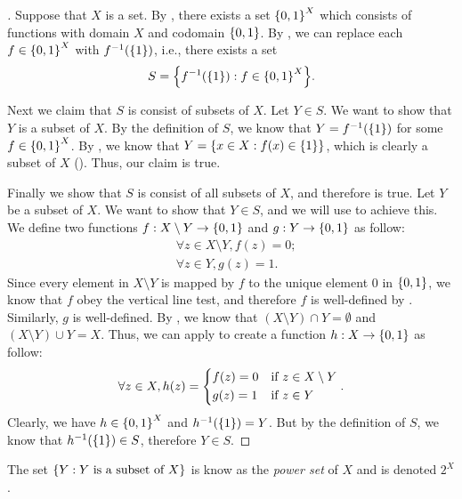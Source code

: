 \begin{proof}[]
  Suppose that \(X\) is a set.
  By , there exists a set \(\left\lbrace0, 1\right\rbrace^X\) which consists of functions with domain \(X\) and codomain \(\left\lbrace0, 1\right\rbrace\).
  By , we can replace each \(f \in \left\lbrace0, 1\right\rbrace^X\) with \(f^{-1}\pa{\set{1}}\), i.e., there exists a set
  \[
    S = \set{f^{-1}\pa{\set{1}} : f \in \set{0, 1}^X}.
  \]

  Next we claim that \(S\) is consist of subsets of \(X\).
  Let \(Y \in S\).
  We want to show that \(Y\) is a subset of \(X\).
  By the definition of \(S\), we know that \(Y = f^{-1}\pa{\set{1}}\) for some \(f \in \left\lbrace0, 1\right\rbrace^X\).
  By , we know that \(Y = \left\lbrace x \in X : f(x) \in \left\lbrace1\right\rbrace\right\rbrace\), which is clearly a subset of \(X\) ().
  Thus, our claim is true.

  Finally we show that \(S\) is consist of all subsets of \(X\), and therefore  is true.
  Let \(Y\) be a subset of \(X\).
  We want to show that \(Y \in S\), and we will use  to achieve this.
  We define two functions \(f : X \setminus Y \to \left\lbrace0, 1\right\rbrace\) and \(g : Y \to \left\lbrace0, 1\right\rbrace\) as follow:
  \begin{align*}
     & \forall z \in X \setminus Y, f(z) = 0; \\
     & \forall z \in Y, g(z) = 1.
  \end{align*}
  Since every element in \(X \setminus Y\) is mapped by \(f\) to the unique element \(0\) in \(\left\lbrace0, 1\right\rbrace\), we know that \(f\) obey the vertical line test, and therefore \(f\) is well-defined by .
  Similarly, \(g\) is well-defined.
  By , we know that \((X \setminus Y) \cap Y = \emptyset\) and \((X \setminus Y) \cup Y = X\).
  Thus, we can apply  to create a function \(h : X \to \left\lbrace0, 1\right\rbrace\) as follow:
  \[
    \forall z \in X, h(z) = \begin{dcases}
      f(z) = 0 & \text{if } z \in X \setminus Y \\
      g(z) = 1 & \text{if } z \in Y
    \end{dcases}.
  \]
  Clearly, we have \(h \in \left\lbrace0, 1\right\rbrace^X\) and \(h^{-1}\pa{\set{1}} = Y\).
  But by the definition of \(S\), we know that \(h^{-1}\pa{\set{1}} \in S\), therefore \(Y \in S\).
\end{proof}

\begin{rmk}\label{i:3.4.10}
  The set \(\left\lbrace Y : Y \text{ is a subset of } X\right\rbrace\) is know as the \emph{power set} of \(X\) and is denoted \(2^X\).
\end{rmk}


